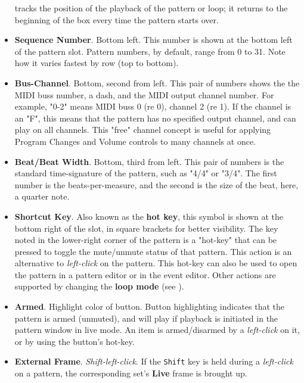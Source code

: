 \begin{itemize}
         tracks the position of the playback of the pattern or loop; it
         returns to the beginning of the box every time the pattern starts
         over.
      \item \textbf{Sequence Number}. Bottom left.
         This number is shown at the bottom left of the pattern slot.
         Pattern numbers, by default, range from 0 to 31.
         Note how it varies fastest by row (top to bottom).
      \item \textbf{Bus-Channel}. Bottom, second from left.
         This pair of numbers shows the the MIDI buss number, a dash, and
         the MIDI output channel number.
         For example, "0-2" means MIDI buss 0 (re 0), channel 2 (re 1).
         If the channel is an "F", this means that the pattern has no specified
         output channel, and can play on all channels.
         This "free" channel concept is useful for applying Program Changes and
         Volume controls to many channels at once.
      \item \textbf{Beat/Beat Width}. Bottom, third from left.
         This pair of numbers is the standard time-signature of the pattern,
         such as "4/4" or "3/4".  The first number is the beats-per-measure,
         and the second is the size of the beat, here, a quarter note.
      \item \textbf{Shortcut Key}.  Also known as the
         \textbf{hot key}, this symbol is shown at the bottom right of the
         slot, in square brackets for better visibility.
         The key noted in the lower-right corner of the pattern is a "hot-key"
         that can be pressed to toggle the mute/unmute status of that pattern.
         This action is an alternative to
         \textsl{left-click} on the pattern.
         This hot-key can also be used to open the pattern in a pattern editor
         or in the event editor.
         Other actions are supported by changing the 
         \textbf{loop mode} 
         (see ).
      \item \textbf{Armed}. Highlight color of button.
         Button highlighting indicates that the pattern is armed
         (unmuted), and will play if playback is initiated in the pattern
         window in live mode.
         An item is armed/disarmed by a
         \textsl{left-click} on it, or by using the
         button's hot-key.
      \item \textbf{External Frame}. \textsl{Shift-left-click}.
         If the \texttt{Shift} key is held during a
         \textsl{left-click} on a pattern,
         the corresponding set's \textbf{Live} frame is brought up.
   \end{itemize}

